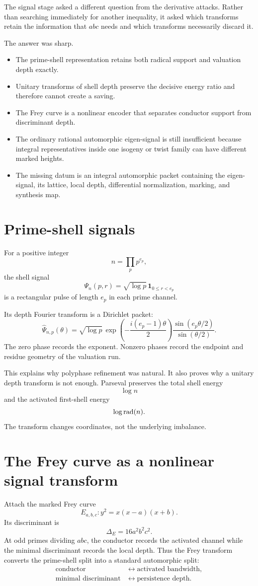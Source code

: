 The signal stage asked a different question from the derivative attacks. Rather than searching immediately for another inequality, it asked which transforms retain the information that $abc$ needs and which transforms necessarily discard it.

The answer was sharp.

\begin{itemize}[leftmargin=1.5em]
\item The prime-shell representation retains both radical support and valuation depth exactly.
\item Unitary transforms of shell depth preserve the decisive energy ratio and therefore cannot create a saving.
\item The Frey curve is a nonlinear encoder that separates conductor support from discriminant depth.
\item The ordinary rational automorphic eigen-signal is still insufficient because integral representatives inside one isogeny or twist family can have different marked heights.
\item The missing datum is an integral automorphic packet containing the eigen-signal, its lattice, local depth, differential normalization, marking, and synthesis map.
\end{itemize}

\section{Prime-shell signals}
For a positive integer
\[
n=\prod_pp^{e_p},
\]
the shell signal
\[
\Psi_n(p,r)=\sqrt{\log p}\,\mathbf1_{0\le r<e_p}
\]
is a rectangular pulse of length $e_p$ in each prime channel.

Its depth Fourier transform is a Dirichlet packet:
\[
\widehat\Psi_{n,p}(\theta)
=
\sqrt{\log p}\,
\exp\left(-\frac{i(e_p-1)\theta}{2}\right)
\frac{\sin(e_p\theta/2)}{\sin(\theta/2)}.
\]
The zero phase records the exponent. Nonzero phases record the endpoint and residue geometry of the valuation run.

This explains why polyphase refinement was natural. It also proves why a unitary depth transform is not enough. Parseval preserves the total shell energy
\[
\log n
\]
and the activated first-shell energy
\[
\log\operatorname{rad}(n).
\]
The transform changes coordinates, not the underlying imbalance.

\section{The Frey curve as a nonlinear signal transform}
Attach the marked Frey curve
\[
E_{a,b,c}:y^2=x(x-a)(x+b).
\]
Its discriminant is
\[
\Delta_E=16a^2b^2c^2.
\]
At odd primes dividing $abc$, the conductor records the activated channel while the minimal discriminant records the local depth. Thus the Frey transform converts the prime-shell split into a standard automorphic split:
\[
\begin{aligned}
\text{conductor}
&\longleftrightarrow
\text{activated bandwidth},\\
\text{minimal discriminant}
&\longleftrightarrow
\text{persistence depth}.
\end{aligned}
\]

